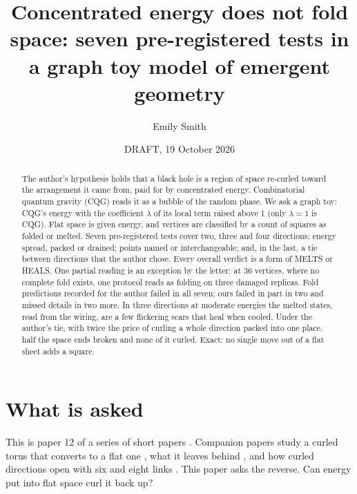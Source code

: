 \documentclass[aps,pre,10pt,twocolumn,superscriptaddress,nofootinbib]{revtex4-2}
\begin{document}
\title{Concentrated energy does not fold space: seven pre-registered tests in a graph toy model of emergent
geometry}

\author{Emily Smith}

\date{DRAFT, 19 October 2026}

\begin{abstract}
The author's hypothesis holds that a black hole is a region of space re-curled toward the arrangement it came from,
paid for by concentrated energy. Combinatorial quantum gravity (CQG) reads it as a bubble of the random phase. We ask
a graph toy: CQG's energy with the coefficient $\lambda$ of its local term raised above 1 (only $\lambda = 1$ is CQG).
Flat space is given energy, and vertices are classified by a count of squares as folded or melted. Seven
pre-registered tests cover two, three and four directions; energy spread, packed or drained; points named or
interchangeable; and, in the last, a tie between directions that the author chose. Every overall verdict is a form of
MELTS or HEALS. One partial reading is an exception by the letter: at 36 vertices, where no complete fold exists, one
protocol reads as folding on three damaged replicas. Fold predictions recorded for the author failed in all seven;
ours failed in part in two and missed details in two more. In three directions at moderate energies the melted
states, read from the wiring, are a few flickering scars that heal when cooled. Under the author's tie, with twice
the price of curling a whole direction packed into one place, half the space ends broken and none of it curled.
Exact: no single move out of a flat sheet adds a square.
\end{abstract}

\maketitle

\section{What is asked}\label{sec:asked}

This is paper 12 of a series of short papers \cite{repo}. Companion papers study a curled torus that converts to a
flat one \cite{paper1}, what it leaves behind \cite{paper2}, and how curled directions open with six and eight links
\cite{paper5}. This paper asks the reverse. Can energy put into flat space curl it back up?
\end{document}
